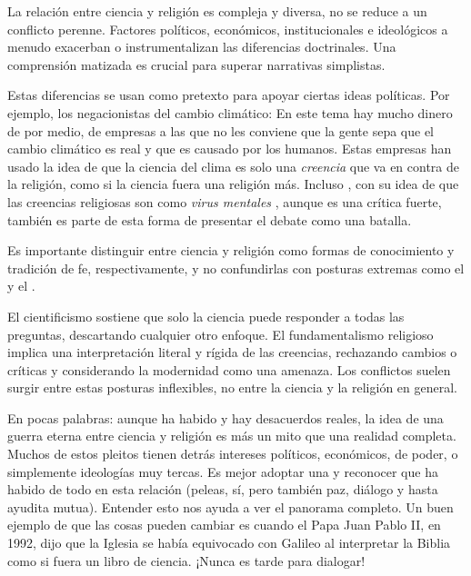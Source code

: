 \begin{remember}
    La relación entre ciencia y religión es compleja y diversa, no se reduce a
    un conflicto perenne.
    Factores políticos, económicos, institucionales e ideológicos a menudo
    exacerban o instrumentalizan las diferencias doctrinales.
    Una comprensión matizada es crucial para superar narrativas simplistas.
\end{remember}

Estas diferencias se usan como pretexto para apoyar ciertas ideas políticas.
Por ejemplo, los negacionistas del cambio climático:
En este tema hay mucho dinero de por medio, de empresas a las que no les
conviene que la gente sepa que el cambio climático es real y que es causado por
los humanos.
Estas empresas han usado la idea de que la ciencia del clima es solo una
\emph{creencia} que va en contra de la religión, como si la ciencia fuera una
religión más.
Incluso ,
con su idea de que las creencias religiosas son como \emph{virus mentales}
\cite{Dahlbom1993-ky}, aunque es una crítica fuerte, también es parte de esta
forma de presentar el debate como una batalla.

Es importante distinguir entre ciencia y religión como formas de conocimiento y
tradición de fe, respectivamente, y no confundirlas con posturas extremas como
el  y el
.

\begin{remember}
    El cientificismo sostiene que solo la ciencia puede responder a todas las
    preguntas, descartando cualquier otro enfoque.
    El fundamentalismo religioso implica una interpretación literal y rígida de
    las creencias, rechazando cambios o críticas y considerando la modernidad
    como una amenaza.
    Los conflictos suelen surgir entre estas posturas inflexibles, no entre la
    ciencia y la religión en general.
\end{remember}

En pocas palabras: aunque ha habido y hay desacuerdos reales, la idea de una
guerra eterna entre ciencia y religión es más un mito que una realidad completa.
Muchos de estos pleitos tienen detrás intereses políticos, económicos, de poder,
o simplemente ideologías muy tercas.
Es mejor adoptar una
 y reconocer que
ha habido de todo en esta relación (peleas, sí, pero también paz, diálogo y
hasta ayudita mutua).
Entender esto nos ayuda a ver el panorama completo.
Un buen ejemplo de que las cosas pueden cambiar es cuando el Papa Juan Pablo II,
en 1992, dijo que la Iglesia se había equivocado con Galileo al interpretar la
Biblia como si fuera un libro de ciencia.
¡Nunca es tarde para dialogar!

